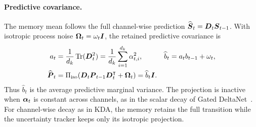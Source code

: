 \documentclass[11pt,letterpaper,logo]{yalearxiv}
\begin{document}
\paragraph{Predictive covariance.}
The memory mean follows the full channel-wise prediction
$\widehat{\boldsymbol{S}}_t=\boldsymbol{D}_t\boldsymbol{S}_{t-1}$. With isotropic process noise
$\boldsymbol{\Omega}_t=\omega_t\boldsymbol{I}$, the retained predictive covariance is
\begin{equation}
\begin{aligned}
  a_t
  &=\frac{1}{d_k}\operatorname{Tr}(\boldsymbol{D}_t^2)
   =\frac{1}{d_k}\sum_{i=1}^{d_k}\alpha_{t,i}^2,
  &
  \widehat b_t
  &=a_tb_{t-1}+\omega_t,
  \\
  \widehat{\boldsymbol{P}}_t
  &=\Pi_{\mathrm{iso}}\!\left(
      \boldsymbol{D}_t\boldsymbol{P}_{t-1}\boldsymbol{D}_t^{\intercal}+\boldsymbol{\Omega}_t
    \right)
   =\widehat b_t\boldsymbol{I}.
\end{aligned}
  \label{eq:iso-kla-predict}
\end{equation}
Thus $\widehat b_t$ is the average predictive marginal variance. The projection is inactive when
$\boldsymbol{\alpha}_t$ is constant across channels, as in the scalar decay of Gated
DeltaNet~\citep{yang2024gdn}. For channel-wise decay as in KDA, the memory retains the full
transition while the uncertainty tracker keeps only its isotropic projection.
\end{document}
